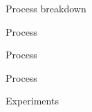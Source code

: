 \documentclass[aspectratio=149]{beamer}
\begin{document}
\begin{frame}{Process breakdown}

\end{frame}

\begin{frame}{Process }

\end{frame}

\begin{frame}{Process }

\end{frame}

\begin{frame}{Process }

\end{frame}
\begin{frame}{Experiments}


    
\end{frame}





\end{document}
